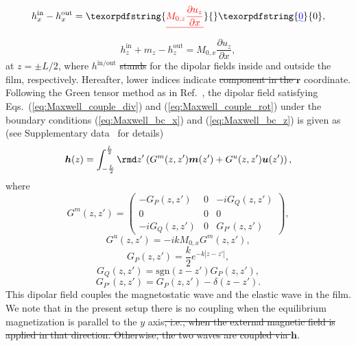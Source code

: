 \documentclass[10pt]{iopart}
\providecommand{\DIFaddtex}[1]{{\protect\color{blue}\uwave{#1}}} %
\providecommand{\DIFdeltex}[1]{{\protect\color{red}\sout{#1}}}                      %
\providecommand{\DIFaddbegin}{} %
\providecommand{\DIFaddend}{} %
\providecommand{\DIFdelbegin}{} %
\providecommand{\DIFdelend}{} %
\providecommand{\DIFadd}[1]{\texorpdfstring{\DIFaddtex{#1}}{#1}} %
\providecommand{\DIFdel}[1]{\texorpdfstring{\DIFdeltex{#1}}{}} %
\newcommand{\DIFscaledelfig}{0.5}
\newlength{\DIFdelgraphicswidth} %
\newlength{\DIFdelgraphicsheight} %
\newcommand{\DIFaddincludegraphics}[2][]{{\color{blue}\fbox{\DIFOincludegraphics[#1]{#2}}}} %
\newcommand{\DIFdelincludegraphics}[2][]{%
\sbox{\DIFdelgraphicsbox}{\DIFOincludegraphics[#1]{#2}}%
\settoboxwidth{\DIFdelgraphicswidth}{\DIFdelgraphicsbox} %
\settoboxtotalheight{\DIFdelgraphicsheight}{\DIFdelgraphicsbox} %
\scalebox{\DIFscaledelfig}{%
\parbox[b]{\DIFdelgraphicswidth}{\usebox{\DIFdelgraphicsbox}\\[-\baselineskip] \rule{\DIFdelgraphicswidth}{0em}}\llap{\resizebox{\DIFdelgraphicswidth}{\DIFdelgraphicsheight}{%
\setlength{\unitlength}{\DIFdelgraphicswidth}%
\begin{picture}(1,1)%
\thicklines\linethickness{2pt} %
{\color[rgb]{1,0,0}\put(0,0){\framebox(1,1){}}}%
{\color[rgb]{1,0,0}\put(0,0){\line( 1,1){1}}}%
{\color[rgb]{1,0,0}\put(0,1){\line(1,-1){1}}}%
\end{picture}%
}\hspace*{3pt}}} %
} %
\DeclareRobustCommand{\DIFaddbegin}{\DIFOaddbegin \let\includegraphics\DIFaddincludegraphics} %
\DeclareRobustCommand{\DIFaddend}{\DIFOaddend \let\includegraphics\DIFOincludegraphics} %
\DeclareRobustCommand{\DIFdelbegin}{\DIFOdelbegin \let\includegraphics\DIFdelincludegraphics} %
\DeclareRobustCommand{\DIFdelend}{\DIFOaddend \let\includegraphics\DIFOincludegraphics} %
\begin{document}
\begin{equation}
    h^{\mathrm{in}}_x-h_x^{\mathrm{out}}=\DIFdelbegin \DIFdel{M_{0,z}\frac{\partial u_z}{\partial x}}\DIFdelend \DIFaddbegin \DIFadd{0}\DIFaddend ,\label{eq:Maxwell_bc_x}
\end{equation}
\begin{equation}
    h^{\mathrm{in}}_z+m_z-h^{\mathrm{out}}_z=M_{0,x}\frac{\partial u_z}{\partial x},\label{eq:Maxwell_bc_z}
\end{equation}
at $z=\pm L/2$, where $h^{\mathrm{in}/\mathrm{out}}$ \DIFdelbegin \DIFdel{stands }\DIFdelend \DIFaddbegin \DIFadd{stand }\DIFaddend for the dipolar fields inside and outside the film, respectively. Hereafter, lower indices indicate \DIFdelbegin \DIFdel{component in the $\bm{r}$ }\DIFdelend \DIFaddbegin \DIFadd{components in the Euler }\DIFaddend coordinate. Following the Green tensor method as in Ref.~\cite{Kalinikos_Slavin_1986}, the dipolar field satisfying Eqs.~(\ref{eq:Maxwell_couple_div}) and (\ref{eq:Maxwell_couple_rot}) under the boundary conditions (\ref{eq:Maxwell_bc_x}) and (\ref{eq:Maxwell_bc_z}) is given as (see Supplementary data~\cite{SM} for details)
\begin{equation}
    \bm{h}(z)=\int_{-\frac{L}{2}}^{\frac{L}{2}}\rmd z'\left(G^m(z,z')\bm{m}(z')+G^u(z,z')\bm{u}(z')\right),\label{eq:dipolar_field}
\end{equation}
where
\begin{equation}
    G^m(z,z')=\left(\begin{array}{ccc}
        -G_P(z,z')&0&-iG_Q(z,z')\\
        0&0&0\\
        -iG_Q(z,z')&0&G_{P'}(z,z')
    \end{array}\right),
\end{equation}
\begin{equation*}
    G^u(z,z')=-ikM_{0,x}G^m(z,z'),
\end{equation*}
\begin{equation}
    G_{P}(z,z')=\frac{k}{2}e^{-k|z-z'|},
\end{equation}
\begin{equation}
    G_{Q}(z,z')=\mathrm{sgn}(z-z')G_{P}(z,z'),
\end{equation}
\begin{equation}
    G_{P'}(z,z')=G_{P}(z,z')-\delta(z-z').
\end{equation}
This dipolar field couples the magnetostatic wave and the elastic wave in the film. We note that in the present setup there is no coupling when the equilibrium magnetization is parallel to the $y$ axis\DIFdelbegin \DIFdel{, i.e., when the external magnetic field is applied in that direction.
Otherwise, the two waves are coupled via $\bm{h}$}\DIFdelend .
\end{document}
